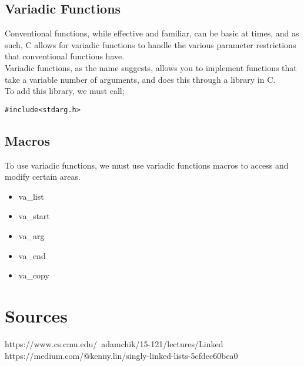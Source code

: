 \documentclass[hidelinks,11pt]{article}
\begin{document}
\subsection{Variadic Functions}
Conventional functions, while effective and familiar, can be basic at times, and as such, C allows for variadic functions to handle the various parameter restrictions that conventional functions have.\\[0.5\baselineskip]
Variadic functions, as the name suggests, allows you to implement functions that take a variable number of arguments, and does this through a library in C. \\[0.5\baselineskip]
To add this library, we must call;
\begin{lstlisting}[belowskip=-1.80 \baselineskip]
    #include<stdarg.h>
\end{lstlisting}
\subsection{Macros}
To use variadic functions, we must use variadic functions macros to access and modify certain areas.
\begin{itemize}
    \item va\_list
    \item va\_start
    \item va\_arg
    \item va\_end
    \item va\_copy
\end{itemize}

\section{Sources}
https://www.cs.cmu.edu/~adamchik/15-121/lectures/Linked%
\\
https://medium.com/@kenny.lin/singly-linked-lists-5cfdec60bea0
\end{document}
